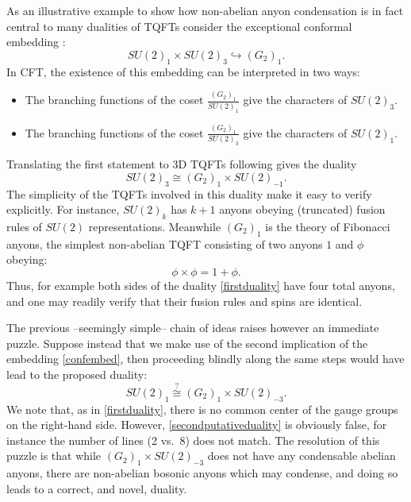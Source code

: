 \documentclass[11pt]{article}
\numberwithin{equation}{section}
\begin{document}
As an illustrative example to show how non-abelian anyon condensation is in fact central to many dualities of TQFTs consider the exceptional  conformal embedding \cite{ PhysRevD.34.3092, PhysRevD.37.2231, boysal2010strange, kac2015conformal,Cordova:2018qvg}:
\begin{equation}\label{confembed}
    SU(2)_{1} \times SU(2)_{3} \hookrightarrow (G_{2})_{1}.
\end{equation}
In CFT, the existence of this embedding can be interpreted in two ways: 
\begin{itemize}
    \item The branching functions of the coset $\frac{(G_{2})_{1}}{SU(2)_{1}}$ give the characters of $SU(2)_{3}$.
    \item The branching functions of the coset $\frac{(G_{2})_{1}}{SU(2)_{3}}$ give the characters of $SU(2)_{1}.$
\end{itemize}
Translating the first statement to 3D TQFTs following \cite{Moore:1989yh} gives the duality
\begin{equation} \label{firstduality}
    SU(2)_{3} \cong (G_{2})_{1} \times SU(2)_{-1}.
\end{equation}
The simplicity of the TQFTs involved in this duality make it easy to verify explicitly.  For instance, $SU(2)_{k}$ has $k+1$ anyons obeying (truncated) fusion rules of $SU(2)$ representations. Meanwhile $(G_{2})_{1}$ is the theory of Fibonacci anyons, the simplest non-abelian TQFT consisting of two anyons $1$ and $\phi$ obeying:
\begin{equation}\label{fibfuse}
    \phi \times \phi=1 +\phi.
\end{equation}
Thus, for example both sides of the duality \eqref{firstduality} have four total anyons, and one may readily verify that their fusion rules and spins are identical.  

The previous --seemingly simple-- chain of ideas raises however an immediate puzzle. Suppose instead that we make use of the second implication of the embedding \eqref{confembed}, then proceeding blindly along the same steps would have lead to the proposed duality:
\begin{equation} \label{secondputativeduality}
    SU(2)_{1} 
   \overset{?}{\cong}    
  (G_{2})_{1} \times SU(2)_{-3}.
\end{equation}
We note that, as in \eqref{firstduality}, there is no common center of the gauge groups on the right-hand side. However, \eqref{secondputativeduality} is obviously false, for instance the number of lines (2 vs.\ 8) does not match. The resolution of this puzzle is that while $(G_{2})_{1} \times SU(2)_{-3}$ does not have any condensable abelian anyons, there are non-abelian bosonic anyons which may condense, and doing so leads to a correct, and novel, duality.  
\end{document}

